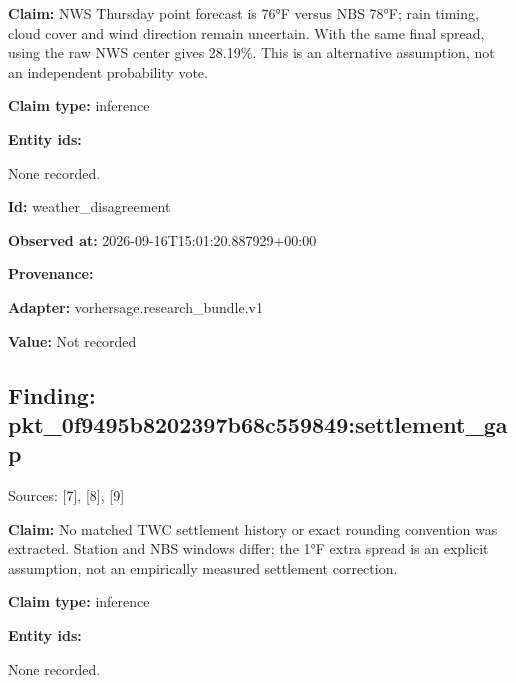 \documentclass[11pt]{article}
\begin{document}
\par\noindent\textbf{Claim:} NWS Thursday point forecast is 76°F versus NBS 78°F; rain timing, cloud cover and wind direction remain uncertain. With the same final spread, using the raw NWS center gives 28.19\%. This is an alternative assumption, not an independent probability vote.

\par\noindent\textbf{Claim type:} inference

\par\noindent\textbf{Entity ids:} \par None recorded.

\par\noindent\textbf{Id:} weather\_disagreement

\par\noindent\textbf{Observed at:} 2026-09-16T1\hspace{0pt}5:01:20.8879\hspace{0pt}29+00:00

\par\noindent\textbf{Provenance:} \par \par\noindent\textbf{Adapter:} vorhersage.r\hspace{0pt}esearch\_bund\hspace{0pt}le.v1

\par\noindent\textbf{Value:} Not recorded

\subsection*{\textcolor{epdarkgreen}{Finding: pkt\_0f9495b8\hspace{0pt}202397b68c55\hspace{0pt}9849:settlem\hspace{0pt}ent\_gap}}
Sources: [7], [8], [9]


\par\noindent\textbf{Claim:} No matched TWC settlement history or exact rounding convention was extracted. Station and NBS windows differ; the 1°F extra spread is an explicit assumption, not an empirically measured settlement correction.

\par\noindent\textbf{Claim type:} inference

\par\noindent\textbf{Entity ids:} \par None recorded.
\end{document}
